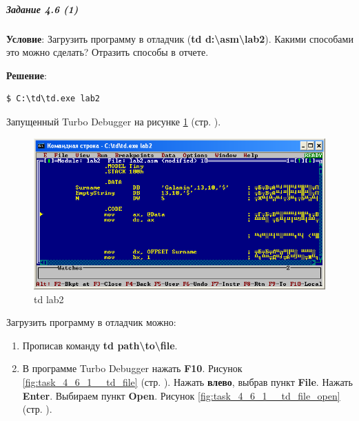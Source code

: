 \subparagraph{Задание 4.6 (1)}

\textbf{Условие}:
Загрузить программу в отладчик (\textbf{td d:\textbackslash\/asm\textbackslash\/lab2}). Какими способами это можно сделать? Отразить способы в отчете.

\textbf{Решение}:

\begin{lstlisting}[language=Terminal]
    $ C:\td\td.exe lab2
\end{lstlisting}

Запущенный Turbo Debugger на рисунке \ref{fig:task_4_6_1__td} (стр. \pageref{fig:task_4_6_1__td}).

\begin{figure}[!htp]
    \centering
    \includegraphics[width=11.2cm]
        {../_INCLUDES/td.png}
    \caption{td lab2}
    \label{fig:task_4_6_1__td}
\end{figure}

Загрузить программу в отладчик можно:
\begin{enumerate}
    \item Прописав команду \textbf{td path\textbackslash\/to\textbackslash\/file}.
    \item В программе Turbo Debugger нажать \textbf{F10}. Рисунок \ref{fig:task_4_6_1__td_file} (стр. \pageref{fig:task_4_6_1__td_file}). Нажать \textbf{влево}, выбрав пункт \textbf{File}. Нажать \textbf{Enter}. Выбираем пункт \textbf{Open}. Рисунок \ref{fig:task_4_6_1__td_file_open} (стр. \pageref{fig:task_4_6_1__td_file_open}).
\end{enumerate}

